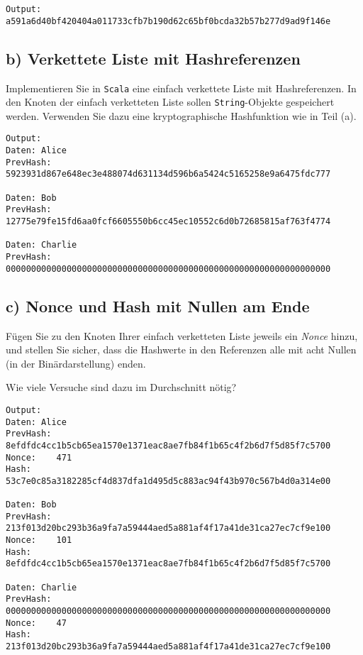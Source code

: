 
\begin{verbatim}
Output: a591a6d40bf420404a011733cfb7b190d62c65bf0bcda32b57b277d9ad9f146e
\end{verbatim}

\vspace{1em}

\newpage
\subsection*{b) Verkettete Liste mit Hashreferenzen}

Implementieren Sie in \texttt{Scala} eine einfach verkettete Liste mit Hashreferenzen.  
In den Knoten der einfach verketteten Liste sollen \texttt{String}-Objekte gespeichert werden.  
Verwenden Sie dazu eine kryptographische Hashfunktion wie in Teil (a).



\begin{verbatim}
Output:
Daten: Alice
PrevHash: 5923931d867e648ec3e488074d631134d596b6a5424c5165258e9a6475fdc777

Daten: Bob
PrevHash: 12775e79fe15fd6aa0fcf6605550b6cc45ec10552c6d0b72685815af763f4774

Daten: Charlie
PrevHash: 0000000000000000000000000000000000000000000000000000000000000000
\end{verbatim}

\newpage
\subsection*{c) Nonce und Hash mit Nullen am Ende}

Fügen Sie zu den Knoten Ihrer einfach verketteten Liste jeweils ein \emph{Nonce} hinzu,  
und stellen Sie sicher, dass die Hashwerte in den Referenzen alle mit acht Nullen (in der Binärdarstellung) enden.  

Wie viele Versuche sind dazu im Durchschnitt nötig?\\



\begin{verbatim}
Output:
Daten: Alice
PrevHash: 8efdfdc4cc1b5cb65ea1570e1371eac8ae7fb84f1b65c4f2b6d7f5d85f7c5700
Nonce:    471
Hash:     53c7e0c85a3182285cf4d837dfa1d495d5c883ac94f43b970c567b4d0a314e00

Daten: Bob
PrevHash: 213f013d20bc293b36a9fa7a59444aed5a881af4f17a41de31ca27ec7cf9e100
Nonce:    101
Hash:     8efdfdc4cc1b5cb65ea1570e1371eac8ae7fb84f1b65c4f2b6d7f5d85f7c5700

Daten: Charlie
PrevHash: 0000000000000000000000000000000000000000000000000000000000000000
Nonce:    47
Hash:     213f013d20bc293b36a9fa7a59444aed5a881af4f17a41de31ca27ec7cf9e100
\end{verbatim}

